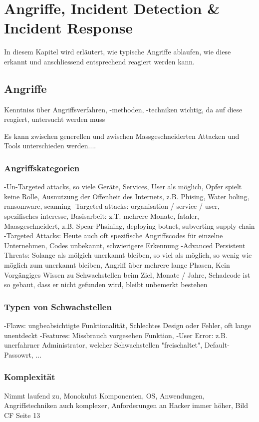\chapter{Angriffe, Incident Detection \& Incident Response}
In diesem Kapitel wird erläutert, wie typische Angriffe ablaufen, wie diese erkannt und anschliessend entsprechend reagiert werden kann.


\section{Angriffe}
Kenntniss über Angriffsverfahren, -methoden, -techniken wichtig, da auf diese reagiert, untersucht werden muss

Es kann zwischen generellen und zwischen Massgeschneiderten Attacken und Tools unterschieden werden....

\subsection{Angriffskategorien}
-Un-Targeted attacks, so viele Geräte, Services, User als möglich, Opfer spielt keine Rolle, Ausnutzung der Offenheit des Internets, z.B. Phising, Water holing, ransomware, scanning
-Targeted attacks: organisation / service / user, spezifisches interesse, Basisarbeit: z.T. mehrere Monate, fataler, Maasgeschneidert, z.B. Spear-Phsining, deploying botnet, subverting supply chain
-Targeted Attacks: Heute auch oft spezifische Angriffscodes für einzelne Unternehmen, Codes unbekannt, schwierigere Erkennung
-Advanced Persistent Threats: Solange als mölgich unerkannt bleiben, so viel als möglich, so wenig wie möglich zum unerkannt bleiben, Angriff über mehrere lange Phasen, Kein Vorgängiges Wissen zu Schwachstellen beim Ziel, Monate / Jahre, Schadcode ist so gebaut, dass er nicht gefunden wird, bleibt unbemerkt bestehen

\subsection{Typen von Schwachstellen}
-Flaws: ungbeabsichtigte Funktionalität, Schlechtes Design oder Fehler, oft lange unentdeckt
-Features: Missbrauch vorgesehen Funktion,
-User Error: z.B. unerfahrner Administrator, welcher Schwachstellen "freischaltet", Default-Passowrt, ...


\subsection{Komplexität}
Nimmt laufend zu, Monokulut Komponenten, OS, Anwendungen, Angriffstechniken auch komplexer, Anforderungen an Hacker immer höher,
Bild CF Seite 13


